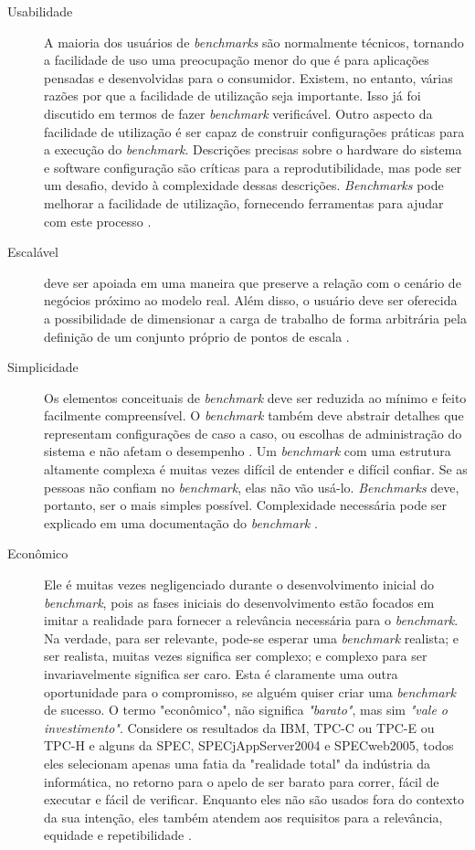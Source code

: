\begin{description}
	\item[Usabilidade] A maioria dos usuários de \textit{benchmarks} são normalmente técnicos, tornando a facilidade de uso uma preocupação menor do que é para aplicações pensadas e desenvolvidas para o consumidor. Existem, no entanto, várias razões por que a facilidade de utilização seja importante.
	Isso já foi discutido em termos de fazer \textit{benchmark} verificável. Outro aspecto da facilidade de utilização é ser capaz de construir configurações práticas para a execução do \textit{benchmark}. Descrições precisas sobre o hardware do sistema e software configuração são críticas para a reprodutibilidade, mas pode ser um desafio, devido à complexidade dessas descrições.
	\textit{Benchmarks} pode melhorar a facilidade de utilização, fornecendo ferramentas para ajudar com este processo \cite{Kistowski2015}. 
	
	\item[Escalável] deve ser apoiada em uma maneira que preserve a relação com o cenário de negócios próximo ao modelo real. Além disso, o usuário deve ser oferecida a possibilidade de dimensionar a carga de trabalho de forma arbitrária pela definição de um conjunto próprio de pontos de escala \cite{Marco2012}. 
	
	\item[Simplicidade] Os elementos conceituais de \textit{benchmark} deve ser reduzida ao mínimo e feito facilmente compreensível. O \textit{benchmark} também deve abstrair detalhes que representam configurações de caso a caso, ou escolhas de administração do sistema e não afetam o desempenho \cite{Chen2014}. Um \textit{benchmark} com uma estrutura altamente complexa é muitas vezes difícil de entender e difícil confiar. Se as pessoas não confiam no \textit{benchmark}, elas não vão usá-lo. \textit{Benchmarks} deve, portanto, ser o mais simples possível. Complexidade necessária pode ser explicado em uma documentação do \textit{benchmark} \cite{Weber2014}.
	
	\item[Econômico] Ele é muitas vezes negligenciado durante o desenvolvimento inicial do \textit{benchmark}, pois as fases iniciais do desenvolvimento estão focados em imitar a realidade para fornecer a relevância necessária para o \textit{benchmark}. Na verdade, para ser relevante, pode-se esperar uma \textit{benchmark} realista; e ser realista, muitas vezes significa ser complexo; e complexo para ser invariavelmente significa ser caro. Esta é claramente uma outra oportunidade para o compromisso, se alguém quiser criar uma \textit{benchmark} de sucesso. O termo "econômico", não significa \textit{"barato"}, mas sim \textit{"vale o investimento"}.
	Considere os resultados da IBM, TPC-C ou TPC-E ou TPC-H e alguns da SPEC, SPECjAppServer2004 e  SPECweb2005, todos eles selecionam apenas uma fatia da "realidade total" da indústria da informática, no retorno para o apelo de ser barato para correr, fácil de executar e fácil de verificar. Enquanto eles não são usados fora do contexto da sua intenção, eles também atendem aos requisitos para a relevância, equidade e repetibilidade \cite{Huppler2009}. 
	

\end{description}
